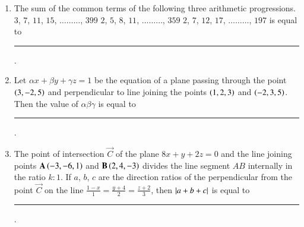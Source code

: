 \documentclass[journal,12pt,onecolumn]{IEEEtran}
\theoremstyle{remark}
\begin{document}
\begin{enumerate}
\hfill{}

\item The sum of the common terms of the following three arithmetic progressions.\newline
$3$, $7$, $11$, $15$, $\dots\dots\dots$, $399$\newline
$2$, $5$, $8$, $11$, $\dots\dots\dots$, $359$\newline
$2$, $7$, $12$, $17$, $\dots\dots\dots$, $197$ is equal to \rule{1cm}{0.15mm}. 

\hfill{}

\item Let $\alpha x+\beta y+\gamma z=1$ be the equation of a plane passing through the point $\left(3,-2,5\right)$ and perpendicular to line joining the points $\left(1,2,3\right)$ and $\left(-2,3,5\right)$. Then the value of $\alpha\beta\gamma$ is equal to \rule{1cm}{0.15mm}.

\hfill{}

\item The point of intersection $\vec{C}$ of the plane $8x+y+2z=0$ and the line joining points $\mathbf{A}\left(-3,-6,1\right)$ and $\mathbf{B}\left(2,4,-3\right)$ divides the line segment $AB$ internally in the ratio $k:1$. If $a$, $b$, $c$  are the direction ratios of the perpendicular from the point $\vec{C}$ on the line $\frac{1-x}{1}=\frac{y+4}{2}=\frac{z+2}{3}$, then $\left\vert a+b+c\right\vert$ is equal to \rule{1cm}{0.15mm}.

\hfill{}

\end{enumerate}
\end{document}
